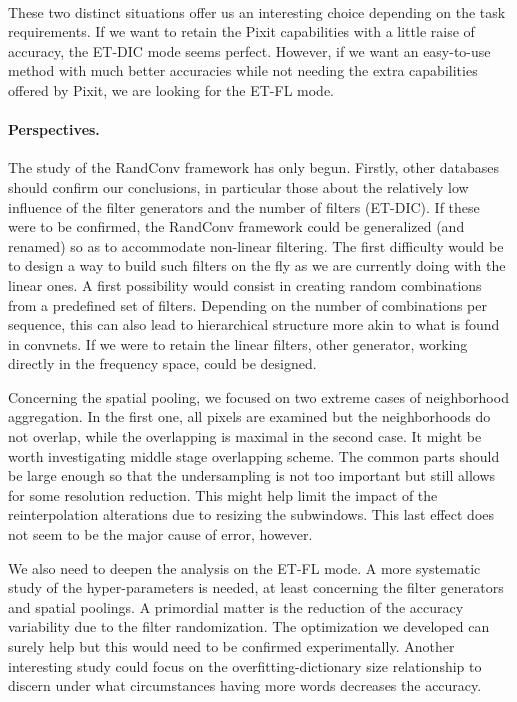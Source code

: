 \documentclass[a4paper]{report}
\newlength{\larg}
\begin{document}
\paragraph{}
These two distinct situations offer us an interesting choice depending on the task requirements. If we want to retain the Pixit capabilities with a little raise of accuracy, the ET-DIC mode seems perfect. However, if we want an easy-to-use method with much better accuracies while not needing the extra capabilities offered by Pixit, we are looking for the ET-FL mode.


\paragraph{Perspectives.}
The study of the RandConv framework has only begun. Firstly, other databases should confirm our conclusions, in particular those about the relatively low influence of the filter generators and the number of filters (ET-DIC). If these were to be confirmed, the RandConv framework could be generalized (and renamed) so as to accommodate non-linear filtering. The first difficulty would be to design a way to build such filters on the fly as we are currently doing with the linear ones. A first possibility would consist in creating random combinations from a predefined set of filters. Depending on the number of combinations per sequence, this can also lead to hierarchical structure more akin to what is found in convnets. If we were to retain the linear filters, other generator, working directly in the frequency space, could be designed.
\par
Concerning the spatial pooling, we focused on two extreme cases of neighborhood aggregation. In the first one, all pixels are examined but the neighborhoods do not overlap, while the overlapping is maximal in the second case. It might be worth investigating middle stage overlapping scheme. The common parts should be large enough so that the undersampling is not too important but still allows for some resolution reduction. This might help limit the impact of the reinterpolation alterations due to resizing the subwindows. This last effect does not seem to be the major cause of error, however.
\par
We also need to deepen the analysis on the ET-FL mode. A more systematic study of the hyper-parameters is needed, at least concerning the filter generators and spatial poolings. A primordial matter is the reduction of the accuracy variability due to the filter randomization. The optimization we developed can surely help but this would need to be confirmed experimentally. Another interesting study could focus on the overfitting-dictionary size relationship to discern under what circumstances having more words decreases the accuracy.
\end{document}
